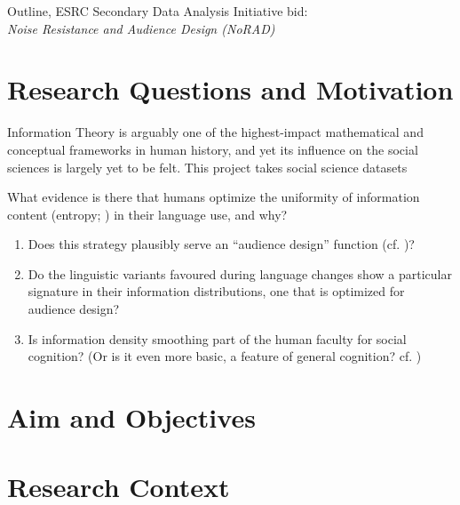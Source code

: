 \documentclass[11pt]{article}
\date{} %
\begin{document}

\begin{center}
\large{Outline, ESRC Secondary Data Analysis Initiative bid:\\ \textsl{Noise Resistance and Audience Design (NoRAD)}}
\end{center}
\vspace{5mm}


\section{Research Questions and Motivation}

Information Theory \citep{shannon1948} is arguably one of the highest-impact mathematical and conceptual frameworks in human history, and yet its influence on the social sciences is largely yet to be felt.
This project takes social science datasets

What evidence is there that humans optimize the uniformity of information content (entropy; \citealt{shannon1948}) in their language use, and why?
\begin{enumerate}
	\item \label{aud} Does this strategy plausibly serve an ``audience design'' function (cf. \citealt{levyjaeger2007})?
	\item \label{change} Do the linguistic variants favoured during language changes show a particular signature in their information distributions, one that is optimized for audience design?
	\item \label{evo} Is information density smoothing part of the human faculty for social cognition? (Or is it even more basic, a feature of general cognition? cf. \citealt{shillcocketal2018})
\end{enumerate}



\section{Aim and Objectives}


\section{Research Context}
\end{document}
